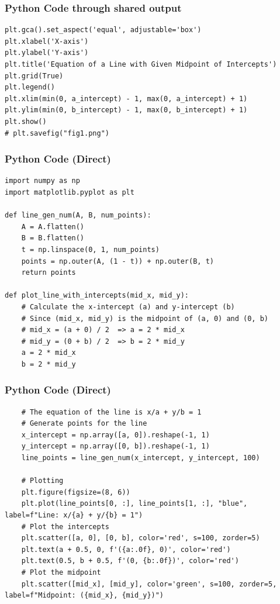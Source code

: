 \documentclass{beamer}
\begin{document}
\begin{frame}[fragile]
\frametitle{Python Code through shared output}
\begin{lstlisting}
plt.gca().set_aspect('equal', adjustable='box')
plt.xlabel('X-axis')
plt.ylabel('Y-axis')
plt.title('Equation of a Line with Given Midpoint of Intercepts')
plt.grid(True)
plt.legend()
plt.xlim(min(0, a_intercept) - 1, max(0, a_intercept) + 1)
plt.ylim(min(0, b_intercept) - 1, max(0, b_intercept) + 1)
plt.show()
# plt.savefig("fig1.png")
\end{lstlisting}
\end{frame}

\begin{frame}[fragile]
\frametitle{Python Code (Direct)}
\begin{lstlisting}
import numpy as np
import matplotlib.pyplot as plt

def line_gen_num(A, B, num_points):
    A = A.flatten()
    B = B.flatten()
    t = np.linspace(0, 1, num_points)
    points = np.outer(A, (1 - t)) + np.outer(B, t)
    return points

def plot_line_with_intercepts(mid_x, mid_y):
    # Calculate the x-intercept (a) and y-intercept (b)
    # Since (mid_x, mid_y) is the midpoint of (a, 0) and (0, b)
    # mid_x = (a + 0) / 2  => a = 2 * mid_x
    # mid_y = (0 + b) / 2  => b = 2 * mid_y
    a = 2 * mid_x
    b = 2 * mid_y
\end{lstlisting}
\end{frame}

\begin{frame}[fragile]
\frametitle{Python Code (Direct)}
\begin{lstlisting}
    # The equation of the line is x/a + y/b = 1
    # Generate points for the line
    x_intercept = np.array([a, 0]).reshape(-1, 1)
    y_intercept = np.array([0, b]).reshape(-1, 1)
    line_points = line_gen_num(x_intercept, y_intercept, 100)

    # Plotting
    plt.figure(figsize=(8, 6))
    plt.plot(line_points[0, :], line_points[1, :], "blue", label=f"Line: x/{a} + y/{b} = 1")
    # Plot the intercepts
    plt.scatter([a, 0], [0, b], color='red', s=100, zorder=5)
    plt.text(a + 0.5, 0, f'({a:.0f}, 0)', color='red')
    plt.text(0.5, b + 0.5, f'(0, {b:.0f})', color='red')
    # Plot the midpoint
    plt.scatter([mid_x], [mid_y], color='green', s=100, zorder=5, label=f"Midpoint: ({mid_x}, {mid_y})")
\end{lstlisting}
\end{frame}
\end{document}
